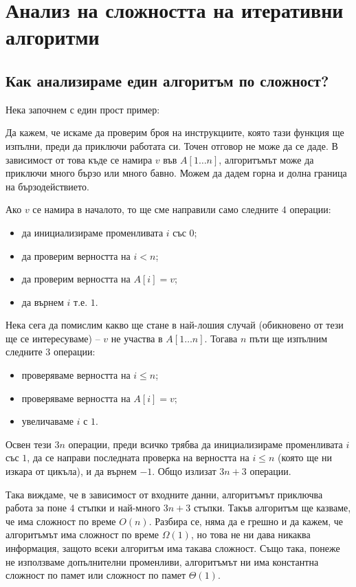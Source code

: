 \chapter{Анализ на сложността на итеративни алгоритми}

\section{Как анализираме един алгоритъм по сложност?}

Нека започнем с един прост пример:


Да кажем, че искаме да проверим броя на инструкциите, която тази функция ще изпълни, преди да приключи работата си.
Точен отговор не може да се даде.
В зависимост от това къде се намира $v$ във $A[1 \dots n]$, алгоритъмът може да приключи много бързо или много бавно.
Можем да дадем горна и долна граница на бързодействието.

Ако $v$ се намира в началото, то ще сме направили само следните $4$ операции:
\begin{itemize}
  \item да инициализираме променливата $i$ със $0$;
  \item да проверим верността на $i < n$;
  \item да проверим верността на $A[i] = v$;
  \item да върнем $i$ т.е. $1$.
\end{itemize}

Нека сега да помислим какво ще стане в най-лошия случай (обикновено от тези ще се интересуваме) -- $v$ не участва в $A[1 \dots n]$.
Тогава $n$ пъти ще изпълним следните $3$ операции:
\begin{itemize}
  \item проверяваме верността на $i \leq n$;
  \item проверяваме верността на $A[i] = v$;
  \item увеличаваме $i$ с $1$.
\end{itemize}
Освен тези $3n$ операции, преди всичко трябва да инициализираме променливата $i$ със $1$, да се направи последната проверка на верността на $i \leq n$ (която ще ни изкара от цикъла), и да върнем $-1$.
Общо излизат $3n + 3$ операции.

Така виждаме, че в зависимост от входните данни, алгоритъмът приключва работа за поне $4$ стъпки и най-много $3n + 3$ стъпки.
Такъв алгоритъм ще казваме, че има сложност по време $O(n)$.
Разбира се, няма да е грешно и да кажем, че алгоритъмът има сложност по време $\Omega(1)$, но това не ни дава никаква информация, защото всеки алгоритъм има такава сложност.
Също така, понеже не използваме допълнителни променливи, алгоритъмът ни има константна сложност по памет или сложност по памет $\Theta(1)$.

